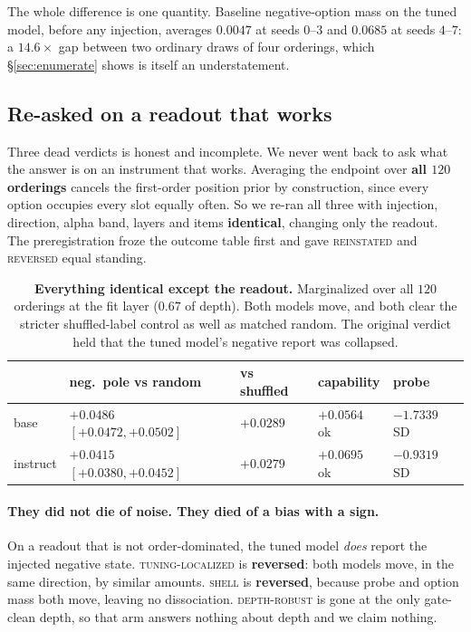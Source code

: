\documentclass{article}
\begin{document}
The whole difference is one quantity. Baseline negative-option mass on the tuned model, before any
injection, averages $0.0047$ at seeds $0$--$3$ and $0.0685$ at seeds $4$--$7$: a $14.6\times$ gap
between two ordinary draws of four orderings, which \S\ref{sec:enumerate} shows is itself an
understatement.

\subsection{Re-asked on a readout that works}

Three dead verdicts is honest and incomplete. We never went back to ask what the answer is on an
instrument that works. Averaging the endpoint over \textbf{all $120$ orderings} cancels the
first-order position prior by construction, since every option occupies every slot equally often.
So we re-ran all three with injection, direction, alpha band, layers and items \textbf{identical},
changing only the readout. The preregistration froze the outcome table first and gave
\textsc{reinstated} and \textsc{reversed} equal standing.

\begin{table}[t]
\centering
\small
\caption{\textbf{Everything identical except the readout.} Marginalized over all $120$ orderings at
the fit layer ($0.67$ of depth). Both models move, and both clear the stricter shuffled-label
control as well as matched random. The original verdict held that the tuned model's negative report
was collapsed.}
\label{tab:readj}
\begin{tabular}{@{}lllll@{}}
\toprule
& \textbf{neg.\ pole vs random} & \textbf{vs shuffled} & \textbf{capability} & \textbf{probe} \\
\midrule
base     & $+0.0486$ $[+0.0472, +0.0502]$ & $+0.0289$ & $+0.0564$ ok & $-1.7339$ SD \\
instruct & $+0.0415$ $[+0.0380, +0.0452]$ & $+0.0279$ & $+0.0695$ ok & $-0.9319$ SD \\
\bottomrule
\end{tabular}
\end{table}

\paragraph{They did not die of noise. They died of a bias with a sign.} On a readout that is not
order-dominated, the tuned model \emph{does} report the injected negative state.
\textsc{tuning-localized} is \textbf{reversed}: both models move, in the same direction, by similar
amounts. \textsc{shell} is \textbf{reversed}, because probe and option mass both move, leaving no
dissociation. \textsc{depth-robust} is gone at the only gate-clean depth, so that arm answers
nothing about depth and we claim nothing.
\end{document}
